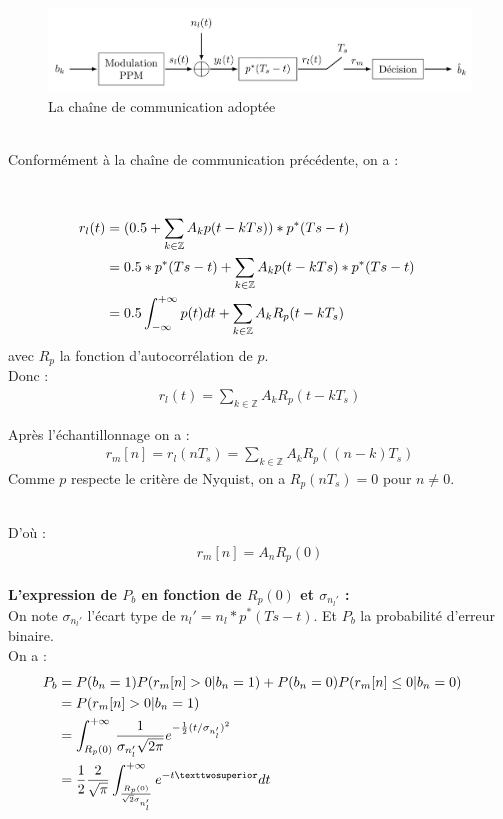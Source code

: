 \documentclass{rapport}
\begin{document}
{\\
\vspace{8}
\begin{figure}[H]
    \centering
    \includegraphics[scale=1]{logos/1_chaine_de_com.png}
    \caption{La chaîne de communication adoptée}
\end{figure}\\
Conformément à la chaîne de communication précédente, on a :

\\
\vspace{8}

$$
\begin{align}
    \mathllap{r_l(t)} &= (0.5 + \sum_{k\in\mathbb{Z}}A_kp(t-kTs))*p^*(Ts-t)\\
    \mathllap{} &= 0.5*p^*(Ts-t) + \sum_{k\in\mathbb{Z}}A_kp(t-kTs)*p^*(Ts-t)\\
    \mathllap{} &= 0.5\int_{-\infty}^{+\infty}p(t)dt + \sum_{k\in\mathbb{Z}}A_kR_p(t-kT_s)
\end{align}
$$
avec $R_p$ la fonction d'autocorrélation de $p$.\\

Donc :
\begin{align}
    r_l(t) = \sum_{k\in\mathbb{Z}} A_kR_p(t-kT_s)
\end{align}

Après l'échantillonnage on a :
$$
\begin{align}
    r_m[n] = r_l(nT_s) = \sum_{k\in\mathbb{Z}} A_kR_p((n-k)T_s)
\end{align}
$$
Comme $p$ respecte le critère de Nyquist, on a $R_p(nT_s) = 0$ pour $n \neq 0$.

\vspace{8}\\
D'où :
\begin{align}
    r_m[n] =A_nR_p(0)
\end{align}
\\
\textbf{L’expression de $P_b$ en fonction de $R_p(0)$ et $\sigma_{n_l'}$ :}
\vspace{8}\\
On note $\sigma_{n_l'}$ l'écart type de $n_l' = n_l * p^*(Ts-t)$. Et $P_b$ la probabilité d'erreur binaire.\\
On a :
$$
\begin{align}
    \mathllap{P_b} &= P(b_n = 1)P(r_m[n] > 0 | b_n = 1) + P(b_n = 0)P(r_m[n] \leq 0 | b_n = 0)\\
    \mathllap{} &= P(r_m[n] > 0 | b_n = 1)\\
    \mathllap{} &= \int_{R_p(0)}^{+\infty} \frac{1}{\sigma_{n_l'}\sqrt{2\pi}}e^{-\frac12(t/\sigma_{n_l'})^2}\\
    \mathllap{} &= \frac12 \frac2{\sqrt\pi}\int_{\frac{R_p(0)}{\sqrt2\sigma_{n_l'}}}^{+\infty}e^{-t²}dt\\
\end{align}
$$

}
\end{document}
